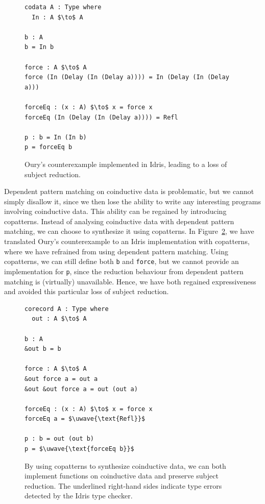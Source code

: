 \begin{figure}
\begin{lstlisting}[mathescape]
codata A : Type where
  In : A $\to$ A

b : A
b = In b

force : A $\to$ A
force (In (Delay (In (Delay a)))) = In (Delay (In (Delay a)))

forceEq : (x : A) $\to$ x = force x
forceEq (In (Delay (In (Delay a)))) = Refl

p : b = In (In b)
p = forceEq b
\end{lstlisting}
  \caption{Oury's counterexample implemented in Idris, leading to a loss of
    subject reduction.}
\label{fig:ourys_counterexample_idris}
\end{figure}

Dependent pattern matching on coinductive data is problematic, but we cannot
simply disallow it, since we then lose the ability to write any interesting
programs involving coinductive data. This ability can be regained by introducing
copatterns. Instead of analysing coinductive data with dependent pattern
matching, we can choose to synthesize it using copatterns. In
Figure~\ref{fig:ourys_counterexample_copatterns}, we have translated Oury's
counterexample to an Idris implementation with copatterns, where we have
refrained from using dependent pattern matching. Using copatterns, we can still
define both \texttt{b} and \texttt{force}, but we cannot provide an
implementation for \texttt{p}, since the reduction behaviour from dependent
pattern matching is (virtually) unavailable. Hence, we have both regained
expressiveness and avoided this particular loss of subject reduction.

\begin{figure}[h]
\begin{lstlisting}[mathescape]
corecord A : Type where
  out : A $\to$ A

b : A
&out b = b

force : A $\to$ A
&out force a = out a
&out &out force a = out (out a)

forceEq : (x : A) $\to$ x = force x
forceEq a = $\uwave{\text{Refl}}$

p : b = out (out b)
p = $\uwave{\text{forceEq b}}$
\end{lstlisting}
  \caption{By using copatterns to synthesize coinductive data, we can both
    implement functions on coinductive data and preserve subject
    reduction. The underlined right-hand sides indicate type errors detected by
    the Idris type checker.}
\label{fig:ourys_counterexample_copatterns}
\end{figure}

